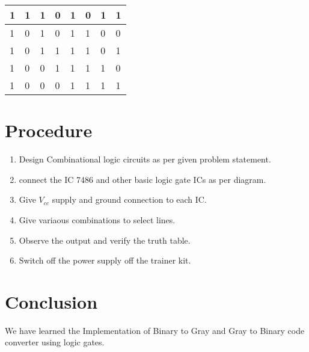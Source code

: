 \documentclass[11pt]{article}
\begin{document}
\begin{table}[]
\begin{tabular}{|llll|llll|}
		\multicolumn{1}{|l|}{1} & \multicolumn{1}{l|}{1} & \multicolumn{1}{l|}{1} & 0 & \multicolumn{1}{l|}{1} & \multicolumn{1}{l|}{0} & \multicolumn{1}{l|}{1} & 1 \\ \hline
		\multicolumn{1}{|l|}{1} & \multicolumn{1}{l|}{0} & \multicolumn{1}{l|}{1} & 0 & \multicolumn{1}{l|}{1} & \multicolumn{1}{l|}{1} & \multicolumn{1}{l|}{0} & 0 \\ \hline
		\multicolumn{1}{|l|}{1} & \multicolumn{1}{l|}{0} & \multicolumn{1}{l|}{1} & 1 & \multicolumn{1}{l|}{1} & \multicolumn{1}{l|}{1} & \multicolumn{1}{l|}{0} & 1 \\ \hline
		\multicolumn{1}{|l|}{1} & \multicolumn{1}{l|}{0} & \multicolumn{1}{l|}{0} & 1 & \multicolumn{1}{l|}{1} & \multicolumn{1}{l|}{1} & \multicolumn{1}{l|}{1} & 0 \\ \hline
		\multicolumn{1}{|l|}{1} & \multicolumn{1}{l|}{0} & \multicolumn{1}{l|}{0} & 0 & \multicolumn{1}{l|}{1} & \multicolumn{1}{l|}{1} & \multicolumn{1}{l|}{1} & 1 \\ \hline
		\end{tabular}
		\end{table}

	
\section{Procedure}

\begin{enumerate}
	\item Design Combinational logic circuits as per given problem statement. 
	\item connect the IC 7486 and other basic logic gate ICs as per diagram. 
	\item Give $V_{cc}$ supply and ground connection to each IC. 
	\item Give variaous combinations to select lines. 
	\item Observe the output and verify the truth table. 
	\item Switch off the power supply off the trainer kit. 
\end{enumerate}


\section{Conclusion}
We have learned the Implementation of Binary to Gray and Gray to Binary code converter using logic gates. 
\end{document}
